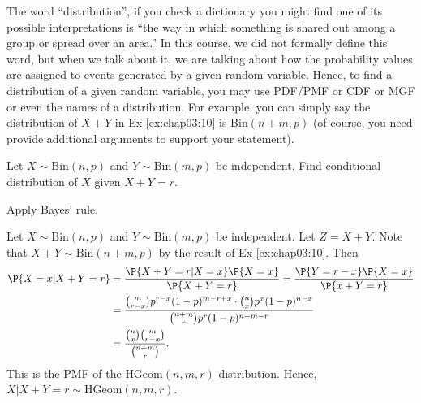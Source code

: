 \begin{remark}
	The word ``distribution'', if you check a dictionary you might find one of its possible interpretations is ``the way in which something is shared out among a group or spread over an area.'' In this course, we did not formally define this word, but when we talk about it, we are talking about how the probability values are assigned to events generated by a given random variable. Hence, to find a distribution of a given random variable, you may use PDF/PMF or CDF or MGF or even the names of a distribution. For example, you can simply say the distribution of $X+Y$ in  Ex \ref{ex:chap03:10} is Bin$(n+m,p)$ (of course, you need provide additional arguments to support your statement).   
\end{remark}

 \begin{exercise}
 	Let $X \sim \text{Bin}(n, p)$ and $Y \sim \text{Bin}(m, p)$ be independent. Find conditional distribution of $X$ given $X + Y = r$.
	\begin{hint}
		Apply Bayes' rule.
	\end{hint}
	\begin{solution}
		Let $X \sim \text{Bin}(n, p)$ and $Y \sim \text{Bin}(m, p)$ be independent. Let $Z = X + Y$. Note that $X + Y \sim \text{Bin}(n + m, p)$ by the result of Ex \ref{ex:chap03:10}. Then
		\begin{align*}
			\P{X = x | X + Y = r} & = \frac{\P{X + Y = r | X = x} \P{X = x}}{\P{X + Y = r}} = \frac{\P{Y = r - x} \P{X = x}}{\P{x + Y = r}} \\
			& = \frac{\binom{m}{r - x} p^{r - x} (1 - p)^{m - r + x} \cdot \binom{n}{x} p^x (1 - p)^{n - x}}{\binom{n + m}{r} p^r (1 - p)^{n + m - r}} \\
			& = \frac{\binom{n}{x} \binom{m}{r - x}}{\binom{n + m}{r}}.
		\end{align*}
		This is the PMF of the $\text{HGeom}(n, m, r)$ distribution. Hence, $X | X + Y = r \sim \text{HGeom}(n, m, r)$.
	\end{solution}
\end{exercise}

